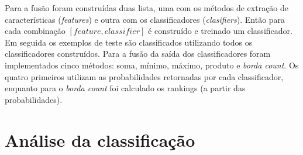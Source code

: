 \documentclass[journal]{IEEEtran}
\begin{document}
Para a fusão foram construídas duas lista, uma com os métodos de extração de características ({\it features}) e outra com os classificadores ({\it clasifiers}).
Então para cada combinação $[feature, classifier]$ é construído e treinado um classificador.
Em seguida os exemplos de teste são classificados utilizando todos os classificadores construídos.
Para a fusão da saída dos classificadores foram implementados cinco métodos: soma, mínimo, máximo, produto e {\it borda count}.
Os quatro primeiros utilizam as probabilidades retornadas por cada classificador, 
enquanto para o {\it borda count} foi calculado os rankings (a partir das probabilidades).

\section {Análise da classificação}
\end{document}
